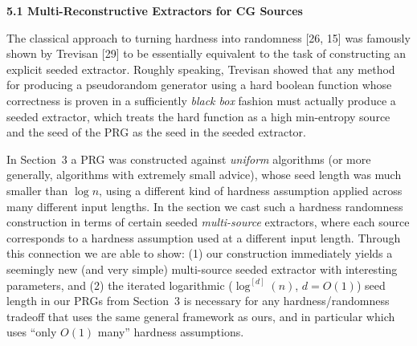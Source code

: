 \par\medskip\noindent\textbf{
5.1 Multi-Reconstructive Extractors for CG Sources}\par




The classical approach to turning hardness into randomness [26, 15] was famously shown by Trevisan [29] to be essentially equivalent to the task of constructing an explicit seeded extractor. Roughly speaking, Trevisan showed that any method for producing a pseudorandom generator using a hard boolean function whose correctness is proven in a sufficiently \emph{black box} fashion must actually produce a seeded extractor, which treats the hard function as a high min-entropy source and the seed of the PRG as the seed in the seeded extractor.\par




In Section 3 a PRG was constructed against \emph{uniform} algorithms (or more generally, algorithms with extremely small advice), whose seed length was much smaller than $\log n$, using a different kind of hardness assumption applied across many different input lengths. In the section we cast such a hardness randomness construction in terms of certain seeded \emph{multi-source} extractors, where each source corresponds to a hardness assumption used at a different input length. Through this connection we are able to show: (1) our construction immediately yields a seemingly new (and very simple) multi-source seeded extractor with interesting parameters, and (2) the iterated logarithmic ($\log^{[d]}(n)$, $d=O(1)$) seed length in our PRGs from Section 3 is necessary for any hardness/randomness tradeoff that uses the same general framework as ours, and in particular which uses “only $O(1)$ many” hardness assumptions.\par




